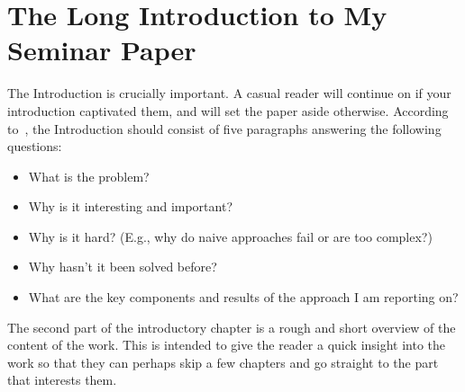 \section[Introduction]{The Long Introduction to My Seminar Paper}

The Introduction is crucially important. A casual reader will continue on if your introduction
captivated them, and will set the paper aside otherwise. According to~\cite{JW06}, the Introduction
should consist of five paragraphs answering the following questions:
\begin{itemize}
    \item What is the problem?
    \item Why is it interesting and important?
    \item Why is it hard? (E.g., why do naive approaches fail or are too complex?)
    \item Why hasn't it been solved before?
    \item What are the key components and results of the approach I am reporting on? 
\end{itemize}

The second part of the introductory chapter is a rough and short overview of the content of the
work. This is intended to give the reader a quick insight into the work so that they can perhaps
skip a few chapters and go straight to the part that interests them.
